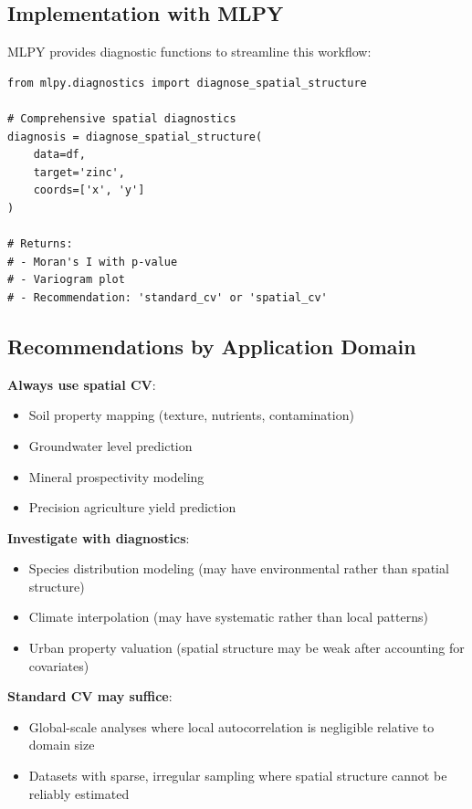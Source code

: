 \documentclass[review,12pt]{elsarticle}
\begin{document}
\subsection{Implementation with MLPY}

MLPY provides diagnostic functions to streamline this workflow:

\begin{verbatim}
from mlpy.diagnostics import diagnose_spatial_structure

# Comprehensive spatial diagnostics
diagnosis = diagnose_spatial_structure(
    data=df,
    target='zinc',
    coords=['x', 'y']
)

# Returns:
# - Moran's I with p-value
# - Variogram plot
# - Recommendation: 'standard_cv' or 'spatial_cv'
\end{verbatim}

\subsection{Recommendations by Application Domain}

\textbf{Always use spatial CV}:
\begin{itemize}
\item Soil property mapping (texture, nutrients, contamination)
\item Groundwater level prediction
\item Mineral prospectivity modeling
\item Precision agriculture yield prediction
\end{itemize}

\textbf{Investigate with diagnostics}:
\begin{itemize}
\item Species distribution modeling (may have environmental rather than spatial structure)
\item Climate interpolation (may have systematic rather than local patterns)
\item Urban property valuation (spatial structure may be weak after accounting for covariates)
\end{itemize}

\textbf{Standard CV may suffice}:
\begin{itemize}
\item Global-scale analyses where local autocorrelation is negligible relative to domain size
\item Datasets with sparse, irregular sampling where spatial structure cannot be reliably estimated
\end{itemize}
\end{document}
